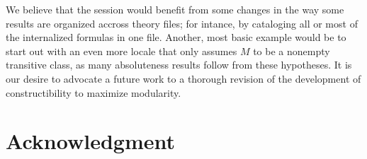 \medskip
{}

\medskip


We believe that the
 session  would benefit from some changes in
the way some results are organized accross theory files; for
intance, by cataloging all or most of the internalized formulas in one
file. Another, most basic example would be to start out with an even
more locale that only assumes $M$ to be a nonempty transitive class,
as many absoluteness results follow from these hypotheses.  
It is our desire to advocate a future work to a thorough
revision of the development of constructibility to maximize modularity.

\section*{Acknowledgment}


